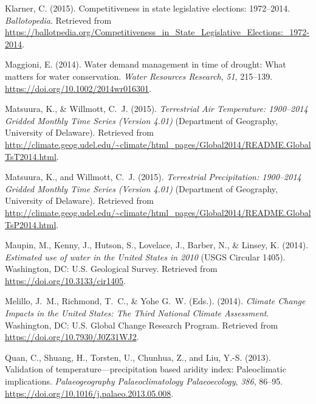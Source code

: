 \documentclass[draft]{agujournal}
\begin{document}
\begin{thebibliography}{33}
  Klarner, C. (2015).
  Competitiveness in state legislative elections: 1972--2014.
  \textit{Ballotopedia}.
  Retrieved from
  \url{https://ballotpedia.org/Competitiveness_in_State_Legislative_Elections:_1972-2014}.

  Maggioni, E. (2014).
  Water demand management in time of drought: {W}hat matters for water conservation.
  \textit{Water Resources Research}, \textit{51}, 215--139.
  \url{https://doi.org/10.1002/2014wr016301}.

  Matsuura, K., \& Willmott, C.~J. (2015{}).
  \textit{Terrestrial Air Temperature: 1900--2014 Gridded Monthly Time Series (Version 4.01)\/}
  (Department of  Geography, University of Delaware).
  Retrieved from
  \url{http://climate.geog.udel.edu/~climate/html_pages/Global2014/README.GlobalTsT2014.html}.

  Matsuura, K., and Willmott, C.~J. (2015{}).
  \textit{Terrestrial Precipitation: 1900--2014 Gridded Monthly Time Series (Version 4.01)\/}
  (Department of  Geography, University of Delaware).
  Retrieved from
  \url{http://climate.geog.udel.edu/~climate/html_pages/Global2014/README.GlobalTsP2014.html}.

  Maupin, M., Kenny, J., Hutson, S., Lovelace, J., Barber, N., \& Linsey, K. (2014).
  \textit{Estimated use of water in the {U}nited {S}tates in 2010\/}
  (USGS Circular 1405).
  Washington, DC: U.S. Geological Survey.
  Retrieved from
  \url{https://doi.org/10.3133/cir1405}.

  Melillo, J.~M., Richmond, T.~C., \&  Yohe G.~W. (Eds.). (2014).
  \textit{Climate Change Impacts in the {U}nited {S}tates: {T}he Third National Climate
  Assessment}.
  Washington, DC: U.S. Global Change Research Program.
  Retrieved from \url{https://doi.org/10.7930/J0Z31WJ2}.

  Quan, C., Shuang, H., Torsten, U., Chunhua, Z., and Liu, Y.-S. (2013).
  Validation of temperature---precipitation based aridity index: Paleoclimatic
  implications.
  \textit{Palaeogeography Palaeoclimatology Palaeoecology}, \textit{386}, 86--95.
  \url{https://doi.org/10.1016/j.palaeo.2013.05.008}.


\end{thebibliography}
\end{document}
